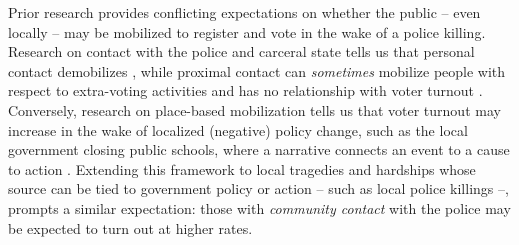 \documentclass[12pt]{article}
\newcommand{\kscomment}[1]{\textbf{\textcolor{Thistle}{[[ #1 --- KS ]]}}}
\begin{document}
Prior research provides conflicting expectations on whether the public -- even locally -- may be mobilized to register and vote in the wake of a police killing. 
Research on contact with the police and carceral state tells us that personal contact demobilizes \citep{burch2011turnout,lerman2014arresting,weaver2010political,white2019misdemeanor}, while proximal contact can \textit{sometimes} mobilize people with respect to extra-voting activities and has no relationship with voter turnout \citep{walker2014extending,walker2020mobilized,white2019family}.  
Conversely, research on place-based mobilization tells us that voter turnout may increase in the wake of localized (negative) policy change, such as the local government closing public schools, where a narrative connects an event to a cause to action \citep{nuamah2021close}. Extending this framework to local tragedies and hardships whose source can be tied to government policy or action -- such as local police killings --, prompts a similar expectation: those with \textit{community contact} with the police may be expected to turn out at higher rates.  %
\end{document}
